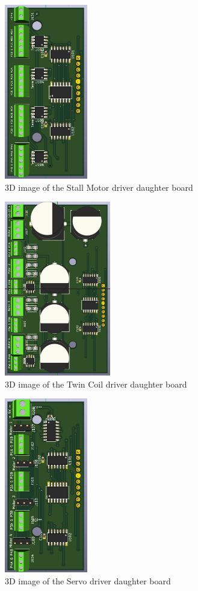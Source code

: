 \begin{figure}[hbpt]\begin{centering}%
\includegraphics[height=3in]{SM-DaughterBoard.png}
\caption{3D image of the Stall Motor driver daughter board}
\end{centering}\end{figure}
\begin{figure}[hbpt]\begin{centering}%
\includegraphics[height=3in]{TC-DaughterBoard.png}
\caption{3D image of the Twin Coil driver daughter board}
\end{centering}\end{figure}
\begin{figure}[hbpt]\begin{centering}%
\includegraphics[height=3in]{TS-DaughterBoard.png}
\caption{3D image of the Servo driver daughter board}
\end{centering}\end{figure}
\clearpage

